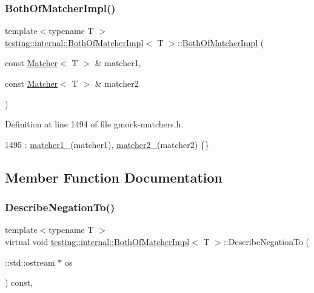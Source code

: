 \subsubsection{\texorpdfstring{Both\+Of\+Matcher\+Impl()}{BothOfMatcherImpl()}}
{\footnotesize\ttfamily template$<$typename T $>$ \\
\hyperlink{classtesting_1_1internal_1_1BothOfMatcherImpl}{testing\+::internal\+::\+Both\+Of\+Matcher\+Impl}$<$ T $>$\+::\hyperlink{classtesting_1_1internal_1_1BothOfMatcherImpl}{Both\+Of\+Matcher\+Impl} (\begin{DoxyParamCaption}\item[{const \hyperlink{classtesting_1_1Matcher}{Matcher}$<$ T $>$ \&}]{matcher1,  }\item[{const \hyperlink{classtesting_1_1Matcher}{Matcher}$<$ T $>$ \&}]{matcher2 }\end{DoxyParamCaption})\hspace{0.3cm}{\ttfamily [inline]}}



Definition at line 1494 of file gmock-\/matchers.\+h.


\begin{DoxyCode}
1495       : \hyperlink{classtesting_1_1internal_1_1BothOfMatcherImpl_a31f8739f880776e209a3e5bd96ddfbf6}{matcher1\_}(matcher1), \hyperlink{classtesting_1_1internal_1_1BothOfMatcherImpl_aeb19d68ac4732ad2ca45a9d37ad955cb}{matcher2\_}(matcher2) \{\}
\end{DoxyCode}


\subsection{Member Function Documentation}
\mbox{\label{classtesting_1_1internal_1_1BothOfMatcherImpl_a4f6017c7aca6e5c8166ff4c613d8dbec}} 
\subsubsection{\texorpdfstring{Describe\+Negation\+To()}{DescribeNegationTo()}}
{\footnotesize\ttfamily template$<$typename T $>$ \\
virtual void \hyperlink{classtesting_1_1internal_1_1BothOfMatcherImpl}{testing\+::internal\+::\+Both\+Of\+Matcher\+Impl}$<$ T $>$\+::Describe\+Negation\+To (\begin{DoxyParamCaption}\item[{\+::std\+::ostream $\ast$}]{os }\end{DoxyParamCaption}) const\hspace{0.3cm}{\ttfamily [inline]}, {\ttfamily [virtual]}}



